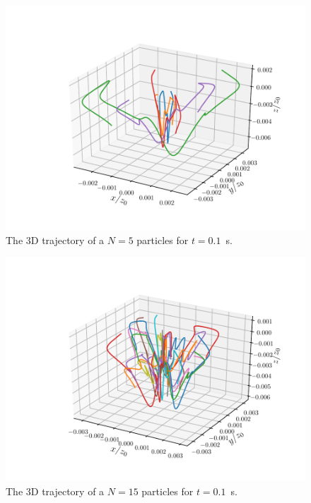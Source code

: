 \documentclass[%
oneside,                 %
final,                   %
10pt]{article}
\newenvironment{doconceexercise}{}{}
\begin{document}
\begin{doconceexercise}
\begin{figure}[!ht]  %
  \centerline{\includegraphics[width=0.8\linewidth]{figures/paul_trap_particles_5_total_time_0.1.pdf}}
  \caption{
  The 3D trajectory of a $N = 5$ particles for $t = 0.1$ s. \label{fig:5_particles}
  }
\end{figure}



\begin{figure}[!ht]  %
  \centerline{\includegraphics[width=0.8\linewidth]{figures/paul_trap_particles_15_total_time_0.1.pdf}}
  \caption{
  The 3D trajectory of a $N = 15$ particles for $t = 0.1$ s. \label{fig:15_particles}
  }
\end{figure}



\end{doconceexercise}



\end{document}
